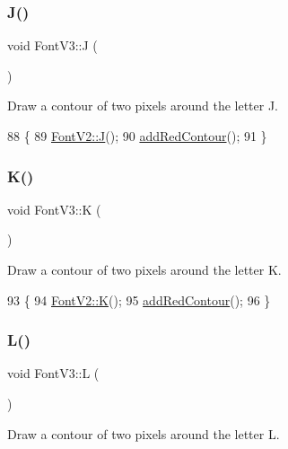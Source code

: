 \subsubsection{\texorpdfstring{J()}{J()}}
{\footnotesize\ttfamily void Font\+V3\+::J (\begin{DoxyParamCaption}{ }\end{DoxyParamCaption})}



Draw a contour of two pixels around the letter J. 


\begin{DoxyCode}
88                \{
89     \mbox{\hyperlink{class_font_v2_a6cc91c88325f086dc95cd733ebda7849}{FontV2::J}}();
90     \mbox{\hyperlink{class_font_v3_a639f1eac0eb6724463813270f47e2696}{addRedContour}}();
91 \}
\end{DoxyCode}
\mbox{\label{class_font_v3_aaa525c66f157b432238af0da208b378b}} 
\subsubsection{\texorpdfstring{K()}{K()}}
{\footnotesize\ttfamily void Font\+V3\+::K (\begin{DoxyParamCaption}{ }\end{DoxyParamCaption})}



Draw a contour of two pixels around the letter K. 


\begin{DoxyCode}
93                \{
94     \mbox{\hyperlink{class_font_v2_a1871c49a753378d2f50ad91ea8b26c10}{FontV2::K}}();
95     \mbox{\hyperlink{class_font_v3_a639f1eac0eb6724463813270f47e2696}{addRedContour}}();
96 \}
\end{DoxyCode}
\mbox{\label{class_font_v3_a8270dc86776fefb9f74cfc9bcf0abfe4}} 
\subsubsection{\texorpdfstring{L()}{L()}}
{\footnotesize\ttfamily void Font\+V3\+::L (\begin{DoxyParamCaption}{ }\end{DoxyParamCaption})}



Draw a contour of two pixels around the letter L. 


